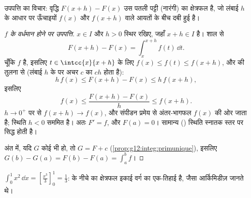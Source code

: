 \begin{omfigure}

{\small उपपत्ति का विचार: वृद्धि $F(x+h) - F(x)$ उस पतली पट्टी (नारंगी) का क्षेत्रफल है,
जो लंबाई $h$ के आधार पर ऊँचाइयों $f(x)$ और $f(x+h)$ वाले आयतों के बीच दबी हुई है।}
\end{omfigure}

\begin{proof}[$f$ के वर्धमान होने पर उपपत्ति]
$x \in I$ और $h > 0$ स्थिर रखिए, जहाँ $x + h \in I$ है। शाल से
\[
F(x+h) - F(x) = \int_x^{x+h} f(t)\,\dd t .
\]
चूँकि $f$  है, इसलिए $t \in \intcc{x}{x+h}$ के लिए $f(x) \leq f(t) \leq f(x+h)$, और  की तुलना से
(लंबाई $h$ के  पर अचर $c$ का  $ch$ होता है):
\[
h\,f(x) \leq F(x+h) - F(x) \leq h\,f(x+h),
\]
इसलिए
\[
f(x) \leq \frac{F(x+h) - F(x)}{h} \leq f(x+h).
\]
$h \to 0^+$ पर  से $f(x+h) \to f(x)$, और संपीडन प्रमेय से अंतर-भागफल $f(x)$ की ओर जाता है;
स्थिति $h < 0$ सममित है। अतः $F' = f$, और $F(a) = 0$। सामान्य ()  स्थिति
स्नातक स्तर पर सिद्ध होती है।

अंत में, यदि $G$ कोई भी  हो, तो $G = F + c$ (\cref{prop:g12:integ:primunique}), इसलिए $G(b) - G(a) = F(b) - F(a) = \int_a^b f$।
\end{proof}

\begin{example}
$\displaystyle\int_0^1 x^2\,\dd x = \left[\frac{x^3}{3}\right]_0^1 =
\frac13$:  के नीचे का क्षेत्रफल इकाई वर्ग का एक-तिहाई है, जैसा आर्किमिडीज़
जानते थे।
\end{example}

